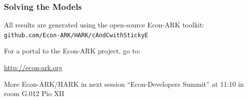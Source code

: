 \documentclass{beamer}\usepackage{dcolumn}
\begin{document}
\begin{frame}
\frametitle{Solving the Models}

All results are generated using the open-source Econ-ARK toolkit:\\
\texttt{github.com/Econ-ARK/HARK/cAndCwithStickyE}


\vspace*{0.3cm}
For a portal to the Econ-ARK project, go to: 
\bi
\item \url{http://econ-ark.org}
\ei

\vspace*{0.3cm}
More Econ-ARK/HARK in next session ``Econ-Developers Summit'' at 11:10 in room G.012 Pio XII

\end{frame}
\end{document}
